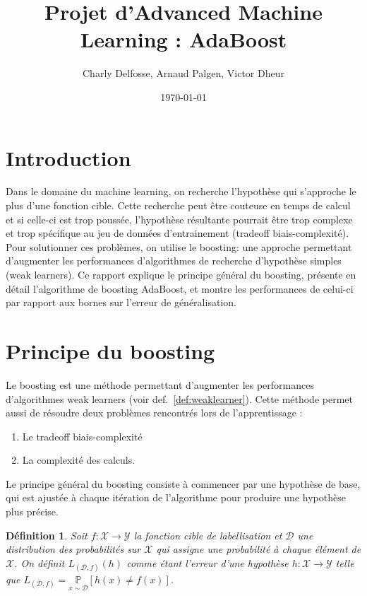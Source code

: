 \documentclass[12pt]{article}
\title{Projet d'Advanced Machine Learning : AdaBoost}
\date{\today}
\author{Charly Delfosse, Arnaud Palgen, Victor Dheur}
\newtheorem{definition}{Définition}
\begin{document}
	\maketitle
	
	\section*{Introduction}
	
	Dans le domaine du machine learning, on recherche l'hypothèse qui s'approche le plus d'une fonction
	cible. Cette recherche peut être couteuse en temps de calcul et si celle-ci est trop poussée, 
	l'hypothèse résultante pourrait être trop complexe et trop spécifique au jeu de données
	d'entrainement (tradeoff biais-complexité). Pour solutionner ces problèmes, on utilise le 
	boosting: une approche permettant d'augmenter les performances d'algorithmes de recherche 
	d'hypothèse simples (weak learners). Ce rapport explique le principe général du boosting,
	présente en détail l'algorithme de boosting AdaBoost, et montre
	les performances de celui-ci par rapport aux bornes sur l'erreur de généralisation.
	
	\section{Principe du boosting}
	
	Le boosting est une méthode permettant d'augmenter les performances\\ d'algorithmes weak learners
	(voir def.~\ref{def:weaklearner}). Cette méthode permet aussi de résoudre deux problèmes
	rencontrés lors de l'apprentissage :
	\begin{enumerate}
		\item Le tradeoff biais-complexité
		\item La complexité des calculs.
	\end{enumerate}
	
	Le principe général du boosting consiste à commencer par une hypothèse de base,
	qui est ajustée à chaque itération de l'algorithme pour produire une hypothèse plus précise.
	
	\begin{definition}
	Soit $f: \mathcal{X} \rightarrow \mathcal{Y}$ la fonction cible de labellisation et $\mathcal{D}$
	une distribution des probabilités sur $\mathcal{X}$ qui assigne une probabilité à chaque élément
	de $\mathcal{X}$. On définit $L_{(\mathcal{D},f)}(h)$ comme étant l'erreur d'une hypothèse
	$h: \mathcal{X} \rightarrow \mathcal{Y}$ telle que
	$L_{(\mathcal{D},f)} = \underset{x \sim \mathcal{D}}{\mathbb{P}} [h(x) \neq f(x)]$.
	\end{definition}	
	
\end{document}
